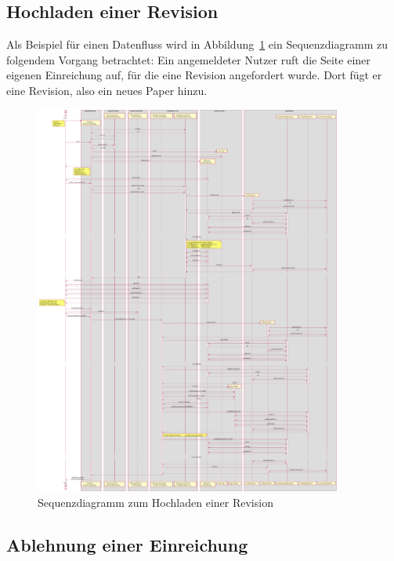 
\subsection{Hochladen einer Revision}\label{subsec:sequenz-revision-hochladen}

Als Beispiel für einen Datenfluss wird in Abbildung~\ref{fig:upload-revision-sequence} ein Sequenzdiagramm zu folgendem Vorgang betrachtet:
Ein angemeldeter Nutzer ruft die Seite einer eigenen Einreichung auf, für die eine Revision angefordert wurde.
Dort fügt er eine Revision, also ein neues Paper hinzu.

\begin{figure}[H]
    \centering
    \includegraphics[width=0.9\textwidth]{graphics/upload_revision}
    \caption{Sequenzdiagramm zum Hochladen einer Revision}
    \label{fig:upload-revision-sequence}
\end{figure}

\subsection{Ablehnung einer Einreichung}\label{subsec:sequenz-ablehnung}

